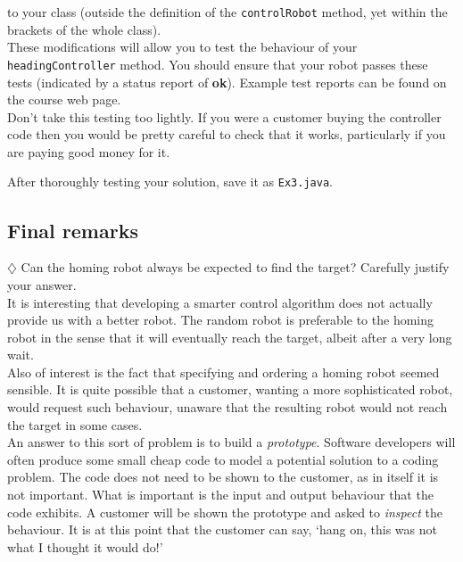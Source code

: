 \noindent
to your class (outside the definition of the {\tt controlRobot} method,
 yet within the brackets of the whole class).\\

\noindent
These modifications will allow you to test the behaviour of your 
{\tt headingController} method. You should ensure that your robot passes 
these tests (indicated by a status report of {\bf ok}). Example test 
reports can be found on the course web page.\\

\noindent
Don't take this testing too lightly. If you were a customer buying the 
controller code then you would be pretty careful to check that it works,
particularly if you are paying good money for it.

\noindent
After thoroughly testing your solution, save it as {\tt Ex3.java}. 


\subsection{Final remarks}

\noindent
$\diamondsuit$
Can the homing robot always be expected to find the target? 
Carefully justify your answer. \\

\noindent
It is interesting that developing a smarter control algorithm does
not actually provide us with a better robot. The random robot
is preferable to the homing robot in the sense that it will eventually reach
the target, albeit after a very long wait. \\

\noindent
Also of interest is the fact that specifying and ordering a homing robot 
seemed sensible. It is quite possible that a customer, wanting a more  
sophisticated robot, would request such behaviour, unaware that the resulting 
robot would not reach the target in some cases.\\

\noindent
An answer to this sort of problem is to build a {\it prototype}. Software 
developers will often produce some small cheap code to model a potential 
solution to a coding problem. The code does not need to be shown to the 
customer, as in itself it is not important. What is important is the input and 
output behaviour that the code exhibits. A customer will be shown the 
prototype and asked to {\it inspect} the behaviour. It is at this point 
that the customer can say, `hang on, this was not what I thought it 
would do!'\\

